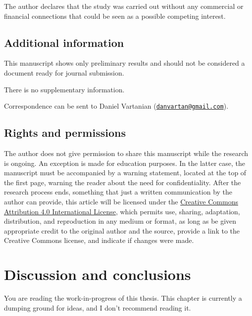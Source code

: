 \documentclass[
  12pt,
  a4paper,
  oneside]{tesesusp}
\begin{document}
The author declares that the study was carried out without any
commercial or financial connections that could be seen as a possible
competing interest.

\hypertarget{additional-information}{%
\section{Additional information}\label{additional-information}}

This manuscript shows only preliminary results and should not be
considered a document ready for journal submission.

There is no supplementary information.

Correspondence can be sent to Daniel Vartanian
(\href{mailto:danvartan@gmail.com}{\nolinkurl{danvartan@gmail.com}}).

\hypertarget{rights-and-permissions}{%
\section{Rights and permissions}\label{rights-and-permissions}}

The author does not give permission to share this manuscript while the
research is ongoing. An exception is made for education purposes. In the
latter case, the manuscript must be accompanied by a warning statement,
located at the top of the first page, warning the reader about the need
for confidentiality. After the research process ends, something that
just a written communication by the author can provide, this article
will be licensed under the
\href{http://creativecommons.org/licenses/by/4.0/}{Creative Commons
Attribution 4.0 International License}, which permits use, sharing,
adaptation, distribution, and reproduction in any medium or format, as
long as be given appropriate credit to the original author and the
source, provide a link to the Creative Commons license, and indicate if
changes were made.

\hypertarget{discussion-and-conclusions}{%
\chapter{Discussion and conclusions}\label{discussion-and-conclusions}}

\begin{tcolorbox}[enhanced jigsaw, breakable, colback=white, colbacktitle=quarto-callout-important-color!10!white, leftrule=.75mm, left=2mm, toprule=.15mm, opacityback=0, rightrule=.15mm, title=\textcolor{quarto-callout-important-color}{\faExclamation}\hspace{0.5em}{Important}, opacitybacktitle=0.6, bottomtitle=1mm, titlerule=0mm, toptitle=1mm, coltitle=black, colframe=quarto-callout-important-color-frame, bottomrule=.15mm, arc=.35mm]

You are reading the work-in-progress of this thesis. This chapter is
currently a dumping ground for ideas, and I don't recommend reading it.

\end{tcolorbox}
\end{document}
